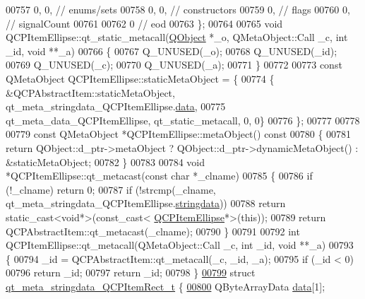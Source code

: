 \begin{DoxyCode}
00757        0,    0, \textcolor{comment}{// enums/sets}
00758        0,    0, \textcolor{comment}{// constructors}
00759        0,       \textcolor{comment}{// flags}
00760        0,       \textcolor{comment}{// signalCount}
00761 
00762        0        \textcolor{comment}{// eod}
00763 \};
00764 
00765 \textcolor{keywordtype}{void} QCPItemEllipse::qt\_static\_metacall(\hyperlink{a00059}{QObject} *\_o, QMetaObject::Call \_c, \textcolor{keywordtype}{int} \_id, \textcolor{keywordtype}{void} **\_a)
00766 \{
00767     Q\_UNUSED(\_o);
00768     Q\_UNUSED(\_id);
00769     Q\_UNUSED(\_c);
00770     Q\_UNUSED(\_a);
00771 \}
00772 
00773 \textcolor{keyword}{const} QMetaObject QCPItemEllipse::staticMetaObject = \{
00774     \{ &QCPAbstractItem::staticMetaObject, qt\_meta\_stringdata\_QCPItemEllipse.\hyperlink{a00067_a7efd0687e2b0fbd2c4df25855b74af30}{data},
00775       qt\_meta\_data\_QCPItemEllipse,  qt\_static\_metacall, 0, 0\}
00776 \};
00777 
00778 
00779 \textcolor{keyword}{const} QMetaObject *QCPItemEllipse::metaObject()\textcolor{keyword}{ const}
00780 \textcolor{keyword}{}\{
00781     \textcolor{keywordflow}{return} QObject::d\_ptr->metaObject ? QObject::d\_ptr->dynamicMetaObject() : &staticMetaObject;
00782 \}
00783 
00784 \textcolor{keywordtype}{void} *QCPItemEllipse::qt\_metacast(\textcolor{keyword}{const} \textcolor{keywordtype}{char} *\_clname)
00785 \{
00786     \textcolor{keywordflow}{if} (!\_clname) \textcolor{keywordflow}{return} 0;
00787     \textcolor{keywordflow}{if} (!strcmp(\_clname, qt\_meta\_stringdata\_QCPItemEllipse.\hyperlink{a00067_a35ee014e43cf9f75fa027534df3b222d}{stringdata}))
00788         \textcolor{keywordflow}{return} \textcolor{keyword}{static\_cast<}\textcolor{keywordtype}{void}*\textcolor{keyword}{>}(\textcolor{keyword}{const\_cast<} \hyperlink{a00035}{QCPItemEllipse}*\textcolor{keyword}{>}(\textcolor{keyword}{this}));
00789     \textcolor{keywordflow}{return} QCPAbstractItem::qt\_metacast(\_clname);
00790 \}
00791 
00792 \textcolor{keywordtype}{int} QCPItemEllipse::qt\_metacall(QMetaObject::Call \_c, \textcolor{keywordtype}{int} \_id, \textcolor{keywordtype}{void} **\_a)
00793 \{
00794     \_id = QCPAbstractItem::qt\_metacall(\_c, \_id, \_a);
00795     \textcolor{keywordflow}{if} (\_id < 0)
00796         \textcolor{keywordflow}{return} \_id;
00797     \textcolor{keywordflow}{return} \_id;
00798 \}
\hypertarget{a00067_source_l00799}{}\hyperlink{a00067}{00799} \textcolor{keyword}{struct }\hyperlink{a00067_de/d79/a00203}{qt\_meta\_stringdata\_QCPItemRect\_t} \{
\hypertarget{a00067_source_l00800}{}\hyperlink{a00067_abb87c72758ddd18aa3c36a7ee960fa1f}{00800}     QByteArrayData \hyperlink{a00067_abb87c72758ddd18aa3c36a7ee960fa1f}{data}[1];

\end{DoxyCode}
